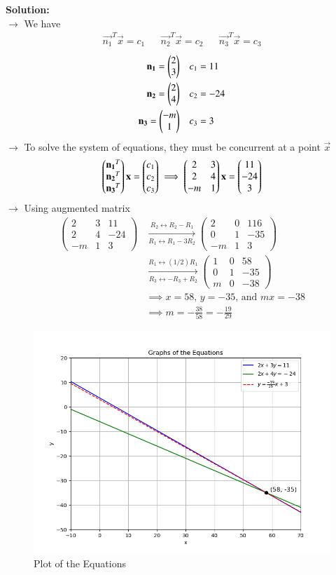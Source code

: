 \documentclass[journal]{IEEEtran}
\begin{document}
\textbf{Solution:}\\
$\rightarrow$ We have
\begin{align*} \vec{n_1}^T\vec{x} = c_1 && \vec{n_2}^T\vec{x} = c_2 && \vec{n_3}^T\vec{x} = c_3 \end{align*}
\begin{align}
    \mathbf{n_1} = \begin{pmatrix}2\\3\end{pmatrix} && c_1 &= 11 \\
    \mathbf{n_2} = \begin{pmatrix}2\\4\end{pmatrix} && c_2 &= -24 \\
    \mathbf{n_3} = \begin{pmatrix}-m\\1\end{pmatrix} && c_3 &= 3
\end{align}
$\rightarrow$ To solve the system of equations, they must be concurrent at a point $\vec{x}$
\begin{align}
    \begin{pmatrix}\mathbf{n_1}^T\\\mathbf{n_2}^T\\\mathbf{n_3}^T\end{pmatrix}\mathbf{x} = \begin{pmatrix}c_1\\c_2\\c_3\end{pmatrix} \implies \begin{pmatrix}2&3\\2&4\\-m&1\end{pmatrix}\mathbf{x} = \begin{pmatrix}11\\-24\\3\end{pmatrix}
\end{align}
$\rightarrow$ Using augmented matrix
\begin{align}
    \left(\begin{array}{cc|c}2&3&11\\2&4&-24\\-m&1&3\end{array}\right)
    &\xrightarrow[R_1 \leftrightarrow R_1 - 3R_2]{R_2 \leftrightarrow R_2 - R_1} \left(\begin{array}{cc|c}2&0&116\\0&1&-35\\-m&1&3\end{array}\right) \\
    &\xrightarrow[R_3 \leftrightarrow -R_3 + R_2]{R_1 \leftrightarrow (1/2)R_1}
    \left(\begin{array}{cc|c}1&0&58\\0&1&-35\\m&0&-38\end{array}\right) \\
    &\implies x = 58\text{, }y = -35\text{, and }mx = -38 \\
    &\implies m = -\frac{38}{58} = -\frac{19}{29}
\end{align}
\begin{figure}[h!]
   \centering
   \includegraphics[width=0.75\linewidth]{figs/01.png}
   \caption{Plot of the Equations}
   \label{Plot_1}
\end{figure}
\end{document}
